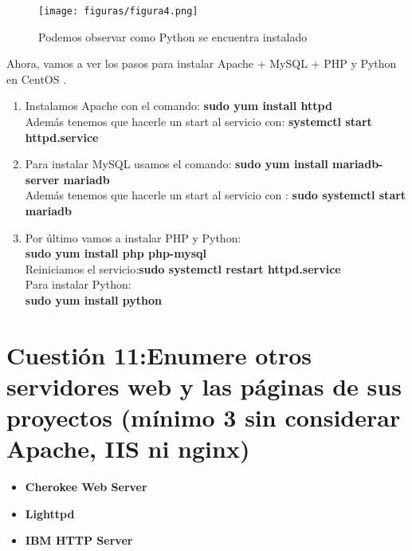 \begin{figure}[H] %
	\centering
	\texttt{[image: figuras/figura4.png]}  %
	\label{figura4}
	
	\caption{Podemos observar como Python se encuentra instalado} 
\end{figure}

 Ahora, vamos a ver los pasos para instalar Apache + MySQL + PHP y Python en CentOS \cite{lamp-centOs}.
 \begin{enumerate}
 	\item Instalamos Apache con el comando: \textbf{sudo yum install httpd} \\
		  Además tenemos que hacerle un start al servicio con: \textbf{systemctl start httpd.service}
	\item Para instalar MySQL usamos el comando: \textbf{sudo yum install mariadb-server mariadb} \\
		  Además tenemos que hacerle un start al servicio con : \textbf{sudo systemctl start mariadb}
	\item Por último vamos a instalar PHP y Python:\\
		  \textbf{sudo yum install php php-mysql} \\
		  Reiniciamos el servicio:\textbf{sudo systemctl restart httpd.service} \\
		  Para instalar Python:\\
		  \textbf{sudo yum install python}
 \end{enumerate}

\section{Cuestión 11:Enumere otros servidores web y las páginas de sus proyectos (mínimo 3 sin considerar Apache, IIS ni nginx)}
\begin{itemize}
	\item \textbf{Cherokee Web Server} \cite{cherokee}
	\item \textbf{Lighttpd} \cite{lighttpd}
	\item \textbf{IBM HTTP Server} \cite{ibm-server}
\end{itemize}


